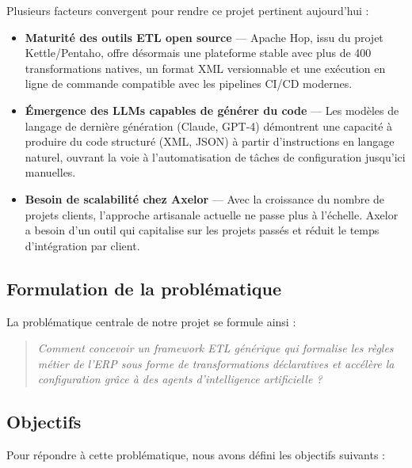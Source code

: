 Plusieurs facteurs convergent pour rendre ce projet pertinent aujourd'hui :

\begin{itemize}
    \item \textbf{Maturité des outils ETL open source} — Apache Hop, issu du projet Kettle/Pentaho, offre désormais une plateforme stable avec plus de 400 transformations natives, un format XML versionnable et une exécution en ligne de commande compatible avec les pipelines CI/CD modernes.
    \item \textbf{Émergence des LLMs capables de générer du code} — Les modèles de langage de dernière génération (Claude, GPT-4) démontrent une capacité à produire du code structuré (XML, JSON) à partir d'instructions en langage naturel, ouvrant la voie à l'automatisation de tâches de configuration jusqu'ici manuelles.
    \item \textbf{Besoin de scalabilité chez Axelor} — Avec la croissance du nombre de projets clients, l'approche artisanale actuelle ne passe plus à l'échelle. Axelor a besoin d'un outil qui capitalise sur les projets passés et réduit le temps d'intégration par client.
\end{itemize}

\subsection{Formulation de la problématique}

La problématique centrale de notre projet se formule ainsi :

\begin{quote}
\textit{Comment concevoir un framework ETL générique qui formalise les règles métier de l'ERP sous forme de transformations déclaratives et accélère la configuration grâce à des agents d'intelligence artificielle ?}
\end{quote}

\subsection{Objectifs}

Pour répondre à cette problématique, nous avons défini les objectifs suivants :

